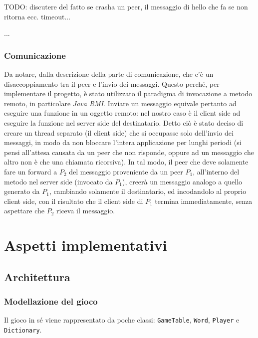 \documentclass[10.5pt]{article}
\begin{document}
TODO: discutere del fatto se crasha un peer, il messaggio di hello che fa se non ritorna ecc. timeout...

...

\subsubsection{Comunicazione}

Da notare, dalla descrizione della parte di comunicazione, che c'è un disaccoppiamento tra il peer e l'invio dei messaggi. Questo perché, per implementare il progetto, è stato utilizzato il paradigma di invocazione a metodo remoto, in particolare \textit{Java RMI}. Inviare un messaggio equivale pertanto ad eseguire una funzione in un oggetto remoto: nel nostro caso è il client side ad eseguire la funzione nel server side del destinatario. Detto ciò è stato deciso di creare un thread separato (il client side) che si occupasse solo dell'invio dei messaggi, in modo da non bloccare l'intera applicazione per lunghi periodi (si pensi all'attesa causata da un peer che non risponde, oppure ad un messaggio che altro non è che una chiamata ricorsiva). In tal modo, il peer che deve solamente fare un forward a $P_2$ del messaggio proveniente da un peer $P_1$, all'interno del metodo nel server side (invocato da $P_1$), creerà un messaggio analogo a quello generato da $P_1$, cambiando solamente il destinatario, ed incodandolo al proprio client side, con il risultato che il client side di $P_1$ termina immediatamente, senza aspettare che $P_2$ riceva il messaggio. 


\section{Aspetti implementativi}

\subsection{Architettura}

\subsubsection{Modellazione del gioco}

Il gioco in sé viene rappresentato da poche classi: \texttt{GameTable}, \texttt{Word}, \texttt{Player} e \texttt{Dictionary}.
\end{document}
